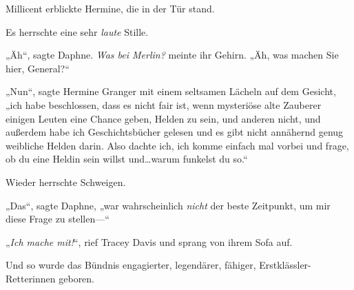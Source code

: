 Millicent erblickte Hermine, die in der Tür stand.

Es herrschte eine sehr \emph{laute} Stille.

„Äh“, sagte Daphne. \emph{Was bei Merlin?} meinte ihr Gehirn. „Äh, was machen Sie hier, General?“

„Nun“, sagte Hermine Granger mit einem seltsamen Lächeln auf dem Gesicht, „ich habe beschlossen, dass es nicht fair ist, wenn mysteriöse alte Zauberer einigen Leuten eine Chance geben, Helden zu sein, und anderen nicht, und außerdem habe ich Geschichtsbücher gelesen und es gibt nicht annähernd genug weibliche Helden darin. Also dachte ich, ich komme einfach mal vorbei und frage, ob du eine Heldin sein willst und…warum funkelst du so.“

Wieder herrschte Schweigen.

„Das“, sagte Daphne, „war wahrscheinlich \emph{nicht} der beste Zeitpunkt, um mir diese Frage zu stellen—“

„\emph{Ich mache mit!}“, rief Tracey Davis und sprang von ihrem Sofa auf.

\later

Und so wurde das Bündnis engagierter, legendärer, fähiger, Erstklässler-Retterinnen geboren.%
